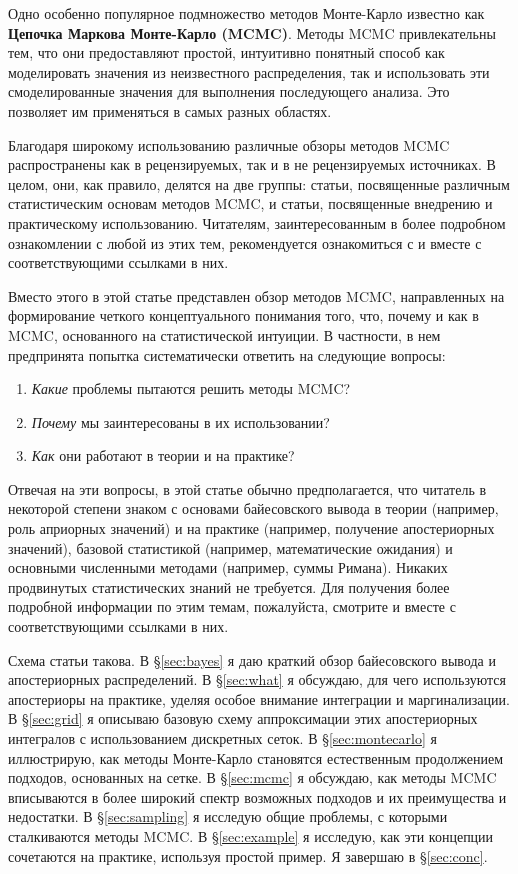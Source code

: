 \documentclass[12pt, titlepage]{article}
\begin{document}
Одно особенно популярное подмножество методов Монте-Карло известно как
\textbf{Цепочка Маркова Монте-Карло (MCMC)}. Методы MCMC привлекательны
тем, что они предоставляют простой, интуитивно понятный способ как моделировать значения
из неизвестного распределения, так и использовать эти смоделированные значения
для выполнения последующего анализа.
Это позволяет им применяться в самых разных областях.

Благодаря широкому использованию различные обзоры методов MCMC
распространены как в рецензируемых, так и в не рецензируемых источниках.
В целом, они, как правило, делятся на две группы: статьи, посвященные различным статистическим основам
методов MCMC, и статьи, посвященные внедрению и практическому использованию.
Читателям, заинтересованным в более подробном ознакомлении с любой из этих тем, рекомендуется
ознакомиться с \citet{brooks+11} и \citet{hoggforemanmackey18_alt} вместе с
соответствующими ссылками в них.

Вместо этого в этой статье представлен обзор методов MCMC, направленных
на формирование четкого концептуального понимания того, что, почему и как в MCMC, основанного на статистической интуиции.
В частности, в нем предпринята попытка систематически ответить на следующие вопросы:
\begin{enumerate}
\item \textit{Какие} проблемы пытаются решить методы MCMC?
\item \textit{Почему} мы заинтересованы в их использовании?
\item \textit{Как} они работают в теории и на практике?	
\end{enumerate}

Отвечая на эти вопросы, в этой статье обычно предполагается, что читатель в некоторой степени знаком с основами байесовского вывода в теории (например, роль априорных значений) и на практике (например, получение апостериорных значений), базовой статистикой (например, математические ожидания) и основными численными методами (например, суммы Римана). Никаких продвинутых статистических знаний не требуется. Для получения более подробной информации по этим темам, пожалуйста, смотрите \citet{gelman+13} и \citet{blitzsteinhwang14} вместе с соответствующими ссылками в них.

Схема статьи такова. 
В \S\ref{sec:bayes} я даю краткий обзор байесовского вывода
и апостериорных распределений. 
В \S\ref{sec:what} я обсуждаю, для чего используются апостериоры на практике,
уделяя особое внимание интеграции и маргинализации.
В \S\ref{sec:grid} я описываю базовую схему аппроксимации
этих апостериорных интегралов с использованием дискретных сеток.
В \S\ref{sec:montecarlo} я иллюстрирую, как методы Монте-Карло
становятся естественным продолжением подходов, основанных на сетке.
В \S\ref{sec:mcmc} я обсуждаю, как методы MCMC вписываются в
более широкий спектр возможных подходов и их преимущества и недостатки.
В \S\ref{sec:sampling} я исследую общие проблемы, с которыми сталкиваются методы MCMC.
В \S\ref{sec:example} я исследую, как эти концепции сочетаются
на практике, используя простой пример.
Я завершаю в \S\ref{sec:conc}.
\end{document}
